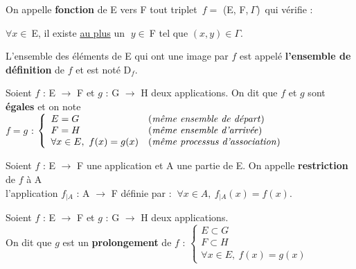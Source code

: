 \vspace{1cm}

On appelle \textbf{fonction} de E vers F tout triplet \(\,f= \) (E, F,\(\ \Gamma\))\, qui vérifie :\vspace{-0.2cm}
\begin{center}
    \(\forall x\in\ \)E, il existe \underline{au plus} un \(\; y\in\ \)F tel que \((x,y)\in \Gamma\).
\end{center}
L'ensemble des éléments de E qui ont une image par \(f\) est appelé \textbf{l'ensemble de définition} de \(f\) et est noté D\(_f\).


\vspace{1.3cm}

\noindent Soient \(f\) : E \(\to\) F et \(g\) : G \(\to\) H deux applications. On dit que \(f\) et \(g\) sont \textbf{égales} et on note \vspace{0.15cm} \\
\(f=g\) \ssi : \(\left\{ 
\begin{array}{ll}
     E=G & \text{(\emph{même ensemble de départ})} \\
     F=H & \text{(\emph{même ensemble d'arrivée})} \\
     \forall x\in E,\ f(x)=g(x) & \text{(\emph{même processus d'association})} 
\end{array}\right. \)

\vspace{1.3cm}

Soient \(f\) : E \(\to\) F une application et A une partie de E. On appelle \textbf{restriction} de $f$ à A\\
l'application \(f_{|A}\) : A \(\to\) F définie par : \(\ \forall x\in A,\ f_{|A}(x)=f(x). \)

\vspace{0.8cm}

\noindent Soient \(f\) : E \(\to\) F et \(g\) : G \(\to\) H deux applications.\vspace{-0.5cm}\\
On dit que \(g\) est un \textbf{prolongement} de $f$ \ssi : \(\left\{ 
\begin{array}{l}
     E\subset G \\
     F\subset H\\
     \forall x\in E,\ f(x)=g(x)
\end{array}  \right.  
\)


\vspace{1cm}

